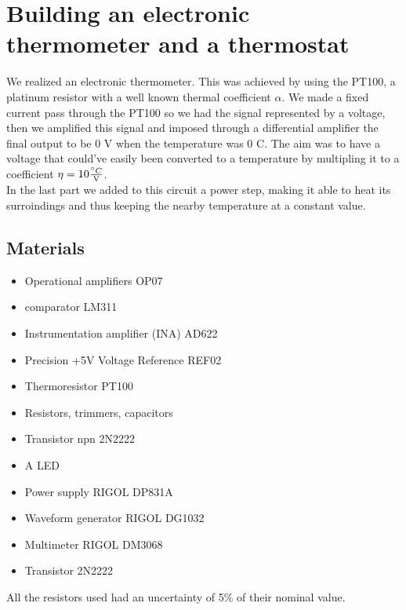 \chapter{Building an electronic thermometer and a thermostat}
We realized an electronic thermometer. This was achieved by using the PT100, a platinum resistor with a well known thermal coefficient $\alpha$. We made a fixed current pass through the PT100 so we had the signal represented by a voltage, then we amplified this signal and imposed through a differential amplifier the final output to be 0 V when the temperature was 0 \degree C. The aim was to have a voltage that could've easily been converted to a temperature by multipling it to a coefficient $\eta = 10 \frac{\degree C}{\text{V}}$.\\
In the last part we added to this circuit a power step, making it able to heat its surroindings and thus keeping the nearby temperature at a constant value.

\section{Materials}
\begin{itemize}
\item Operational amplifiers OP07
\item comparator LM311
\item Instrumentation amplifier (INA) AD622
\item Precision +5V Voltage Reference REF02
\item Thermoresistor PT100
\item Resistors, trimmers, capacitors
\item Transistor npn 2N2222
\item A LED
\item Power supply RIGOL DP831A
\item Waveform generator RIGOL DG1032
\item Multimeter RIGOL DM3068
\item Transistor 2N2222
\end{itemize}
All the resistors used had an uncertainty of 5\% of their nominal value.

